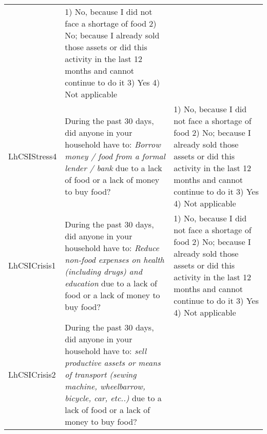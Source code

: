 \documentclass[
]{book}
\begin{document}
\begin{longtable}[]{@{}lll@{}}
\begin{minipage}[t]{0.49\columnwidth}
\end{minipage} & \begin{minipage}[t]{0.27\columnwidth}\raggedright
1) No, because I did not face a shortage of food 2) No; because I already sold those assets or did this activity in the last 12 months and cannot continue to do it 3) Yes 4) Not applicable\strut
\end{minipage}\tabularnewline
\begin{minipage}[t]{0.15\columnwidth}\raggedright
LhCSIStress4\strut
\end{minipage} & \begin{minipage}[t]{0.49\columnwidth}\raggedright
During the past 30 days, did anyone in your household have to: \emph{Borrow money / food from a formal lender / bank} due to a lack of food or a lack of money to buy food?\strut
\end{minipage} & \begin{minipage}[t]{0.27\columnwidth}\raggedright
1) No, because I did not face a shortage of food 2) No; because I already sold those assets or did this activity in the last 12 months and cannot continue to do it 3) Yes 4) Not applicable\strut
\end{minipage}\tabularnewline
\begin{minipage}[t]{0.15\columnwidth}\raggedright
LhCSICrisis1\strut
\end{minipage} & \begin{minipage}[t]{0.49\columnwidth}\raggedright
During the past 30 days, did anyone in your household have to: \emph{Reduce non-food expenses on health (including drugs) and education } due to a lack of food or a lack of money to buy food?\strut
\end{minipage} & \begin{minipage}[t]{0.27\columnwidth}\raggedright
1) No, because I did not face a shortage of food 2) No; because I already sold those assets or did this activity in the last 12 months and cannot continue to do it 3) Yes 4) Not applicable\strut
\end{minipage}\tabularnewline
\begin{minipage}[t]{0.15\columnwidth}\raggedright
LhCSICrisis2\strut
\end{minipage} & \begin{minipage}[t]{0.49\columnwidth}\raggedright
During the past 30 days, did anyone in your household have to: \emph{sell productive assets or means of transport (sewing machine, wheelbarrow, bicycle, car, etc..)} due to a lack of food or a lack of money to buy food?\strut

\end{minipage}
\end{longtable}
\end{document}
